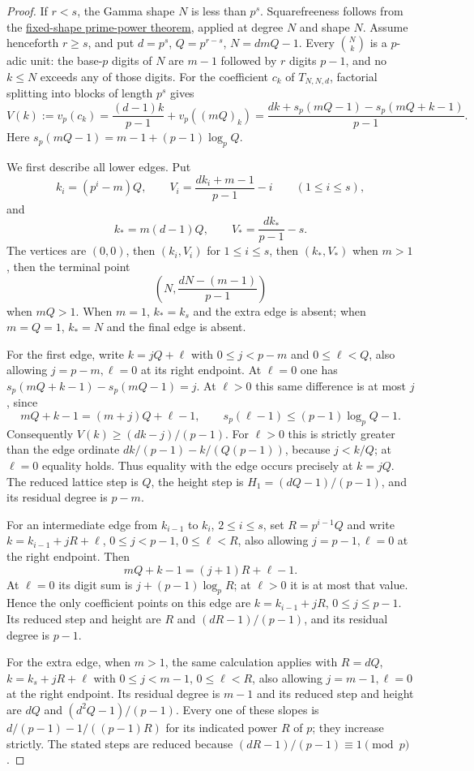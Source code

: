 \documentclass[11pt]{article}
\begin{document}
\begin{proof}
If $r<s$, the Gamma shape $N$ is less than $p^s$.
Squarefreeness follows from the
\href{PRIME_POWER_TWO_TERM_SFC.tex}{fixed-shape prime-power theorem},
applied at degree $N$ and shape $N$. Assume henceforth $r\ge s$,
and put $d=p^s$, $Q=p^{r-s}$, $N=dmQ-1$.
Every $\binom Nk$ is a $p$-adic unit: the base-$p$ digits of $N$
are $m-1$ followed by $r$ digits $p-1$, and no $k\le N$
exceeds any of those digits.
For the coefficient $c_k$ of $T_{N,N,d}$, factorial splitting into
blocks of length $p^s$ gives
\[
 V(k):=v_p(c_k)
 =\frac{(d-1)k}{p-1}+v_p((mQ)_k)
 =\frac{dk+s_p(mQ-1)-s_p(mQ+k-1)}{p-1}.                     \tag{6}
\]
Here $s_p(mQ-1)=m-1+(p-1)\log_p Q$.

We first describe all lower edges. Put
\[
 k_i=(p^i-m)Q,\qquad
 V_i=\frac{d k_i+m-1}{p-1}-i\qquad(1\le i\le s),
\]
and
\[
 k_*=m(d-1)Q,\qquad V_*=\frac{d k_*}{p-1}-s.
\]
The vertices are $(0,0)$, then $(k_i,V_i)$ for $1\le i\le s$,
then $(k_*,V_*)$ when $m>1$, then the terminal point
\[
 \left(N,\frac{dN-(m-1)}{p-1}\right)
\]
when $mQ>1$. When $m=1$, $k_*=k_s$ and the extra edge is absent;
when $m=Q=1$, $k_*=N$ and the final edge is absent.

For the first edge, write $k=jQ+\ell$ with
$0\le j<p-m$ and $0\le\ell<Q$, also allowing
$j=p-m,\ell=0$ at its right endpoint.
At $\ell=0$ one has
$s_p(mQ+k-1)-s_p(mQ-1)=j$.
At $\ell>0$ this same difference is at most $j$, since
\[
 mQ+k-1=(m+j)Q+\ell-1,\qquad
 s_p(\ell-1)\le(p-1)\log_p Q-1.
\]
Consequently $V(k)\ge(dk-j)/(p-1)$.
For $\ell>0$ this is strictly greater than the edge ordinate
$dk/(p-1)-k/(Q(p-1))$, because $j<k/Q$;
at $\ell=0$ equality holds. Thus equality with the edge occurs
precisely at $k=jQ$.
The reduced lattice step is $Q$, the height step is
$H_1=(dQ-1)/(p-1)$, and its residual degree is $p-m$.

For an intermediate edge from $k_{i-1}$ to $k_i$, $2\le i\le s$,
set $R=p^{i-1}Q$ and write
$k=k_{i-1}+jR+\ell$, $0\le j<p-1$, $0\le\ell<R$,
also allowing $j=p-1,\ell=0$ at the right endpoint.
Then
\[
 mQ+k-1=(j+1)R+\ell-1.
\]
At $\ell=0$ its digit sum is $j+(p-1)\log_p R$;
at $\ell>0$ it is at most that value.
Hence the only coefficient points on this edge are
$k=k_{i-1}+jR$, $0\le j\le p-1$.
Its reduced step and height are $R$ and $(dR-1)/(p-1)$,
and its residual degree is $p-1$.

For the extra edge, when $m>1$, the same calculation applies with
$R=dQ$, $k=k_s+jR+\ell$ with $0\le j<m-1$, $0\le\ell<R$,
also allowing $j=m-1,\ell=0$ at the right endpoint.
Its residual degree is $m-1$ and its reduced step and height are
$dQ$ and $(d^2Q-1)/(p-1)$.
Every one of these slopes is
$d/(p-1)-1/((p-1)R)$ for its indicated power $R$ of $p$;
they increase strictly. The stated steps are reduced because
$(dR-1)/(p-1)\equiv1\pmod p$.


\end{proof}
\end{document}
